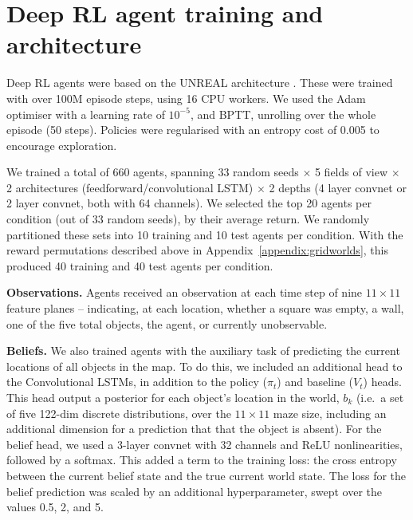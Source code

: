 \documentclass{article}
\begin{document}
\newpage
\section{Deep RL agent training and architecture}
\label{appendix:agents}

Deep RL agents were based on the UNREAL architecture \cite{jaderberg2017reinforcement}. These were trained with over 100M episode steps, using 16 CPU workers. We used the Adam optimiser with a learning rate of $10^{-5}$, and BPTT, unrolling over the whole episode (50 steps). Policies were regularised with an entropy cost of 0.005 to encourage exploration.

We trained a total of 660 agents, spanning 33 random seeds $\times$ 5 fields of view $\times$ 2 architectures (feedforward/convolutional LSTM) $\times$ 2 depths (4 layer convnet or 2 layer convnet, both with 64 channels). We selected the top 20 agents per condition (out of 33 random seeds), by their average return. We randomly partitioned these sets into 10 training and 10 test agents per condition. With the reward permutations described above in Appendix~\ref{appendix:gridworlds}, this produced 40 training and 40 test agents per condition.

{\bf Observations.} Agents received an observation at each time step of nine $11 \times 11$ feature planes -- indicating, at each location, whether a square was empty, a wall, one of the five total objects, the agent, or currently unobservable.

{\bf Beliefs.} We also trained agents with the auxiliary task of predicting the current locations of all objects in the map. To do this, we included an additional head to the Convolutional LSTMs, in addition to the policy ($\pi_t$) and baseline ($V_t$) heads. This head output a posterior for each object's location in the world, $b_k$ (i.e.\ a set of five 122-dim discrete distributions, over the $11\times11$ maze size, including an additional dimension for a prediction that that the object is absent). For the belief head, we used a 3-layer convnet with 32 channels and ReLU nonlinearities, followed by a softmax. This added a term to the training loss: the cross entropy between the current belief state and the true current world state. The loss for the belief prediction was scaled by an additional hyperparameter, swept over the values 0.5, 2, and 5.
\end{document}
